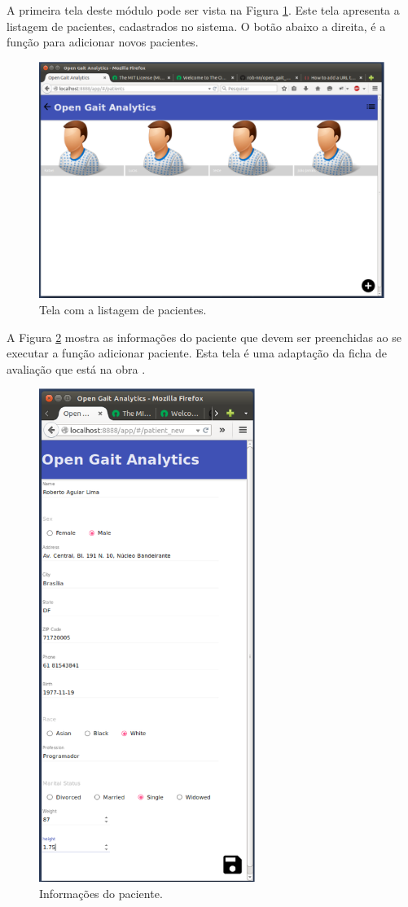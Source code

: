 A primeira tela deste módulo pode ser vista na Figura \ref{tela2}. Este tela apresenta a listagem de pacientes, cadastrados no sistema. O botão abaixo a direita, é a função para adicionar novos pacientes.

\begin{figure}[H]
	\centering
	\includegraphics[width=15cm]{figuras/tela2.eps}
	\caption{Tela com a listagem de pacientes.}
	\label{tela2}
\end{figure}

A Figura \ref{tela3} mostra as informações do paciente que devem ser preenchidas ao se executar a função adicionar paciente. Esta tela é uma adaptação da ficha de avaliação que está na obra .

\begin{figure}[H]
	\centering
	\includegraphics[width=7cm]{figuras/tela3.eps}
	\caption{Informações do paciente.}
	\label{tela3}
\end{figure}

